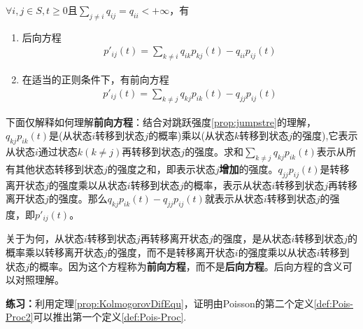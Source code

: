 \begin{theorem}[Kolmogorov微分方程]\label{prop:KolmogorovDifEqu}
	\(\forall i,j\in S,t\geqslant 0\)且\(\sum_{j\neq i}q_{ij}=q_{ii}<+\infty\)，有
	\begin{enumerate}[\bfseries (1)]
		\item 后向方程
		      \begin{align*}
			      p'_{ij}(t)=\sum_{k\neq i}q_{ik}p_{kj}(t)-q_{ii}p_{ij}(t)
		      \end{align*}
		\item 在适当的正则条件下，有前向方程
		      \begin{align*}
			      p'_{ij}(t)=\sum_{k\neq j}q_{kj}p_{ik}(t)-q_{jj}p_{ij}(t)
		      \end{align*}
	\end{enumerate}
\end{theorem}

下面仅解释如何理解\textbf{前向方程}：结合对跳跃强度\ref{prop:jumpstre}的理解，\(q_{kj}p_{ik}(t)\)是(从状态\(i\)转移到状态\(j\)的概率)乘以(从状态\(k\)转移到状态\(j\)的强度),它表示从状态\(i\)通过状态\(k(k\neq j)\)再转移到状态\(j\)的强度。求和\(\sum_{k\neq j}q_{kj}p_{ik}(t)\)表示从所有其他状态转移到状态\(j\)的强度之和，即表示状态\(j\)\textbf{增加}的强度。\(q_{jj}p_{ij}(t)\)是转移离开状态\(j\)的强度乘以从状态\(i\)转移到状态\(j\)的概率，表示从状态\(i\)转移到状态\(j\)再转移离开状态\(j\)的强度。那么\(q_{kj}p_{ik}(t)-q_{jj}p_{ij}(t)\)就表示从状态\(i\)转移到状态\(j\)的强度，即\( p'_{ij}(t)\)。

关于为何，从状态\(i\)转移到状态\(j\)再转移离开状态\(j\)的强度，是从状态\(i\)转移到状态\(j\)的概率乘以转移离开状态\(j\)的强度，而不是转移离开状态\(i\)的强度乘以从状态\(i\)转移到状态\(j\)的概率。因为这个方程称为\textbf{前向方程}，而不是\textbf{后向方程}。后向方程的含义可以对照理解。

\textbf{练习：}利用定理\ref{prop:KolmogorovDifEqu}，证明由Poisson的第二个定义\ref{def:Pois-Proc2}可以推出第一个定义\ref{def:Pois-Proc}.

\newpage

